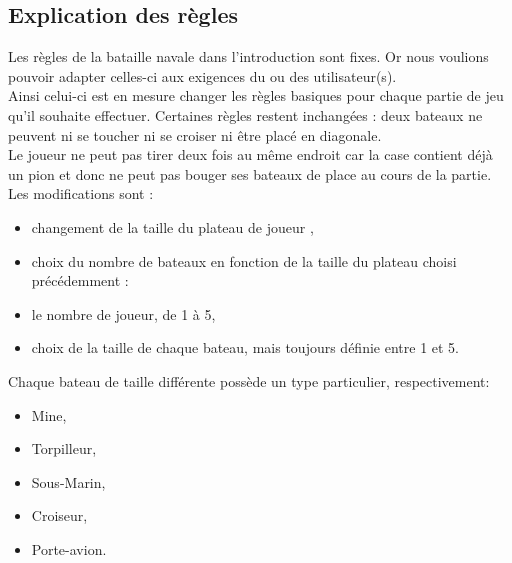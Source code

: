 \documentclass[a4paper,12pt]{article}
\begin{document}
\subsection {Explication des règles}
    Les règles de la bataille navale dans l'introduction sont fixes. Or nous voulions pouvoir adapter celles-ci aux exigences du ou des utilisateur(s). \\ Ainsi celui-ci est en mesure changer les règles basiques pour chaque partie de jeu qu'il souhaite effectuer. Certaines règles restent inchangées : deux bateaux ne peuvent ni se toucher ni se croiser ni être placé en diagonale. \\ Le joueur ne peut pas tirer deux fois au même endroit car la case contient déjà un pion et donc ne peut pas bouger ses bateaux de place au cours de la partie.\vspace{2\baselineskip}\\ Les modifications sont :
            \begin{itemize}
                \item changement de la taille du plateau de joueur ,
                \item choix du nombre de bateaux en fonction de la taille du plateau choisi précédemment :
                \item le nombre de joueur, de 1 à 5,
                \item  choix de la taille de chaque bateau, mais toujours définie entre 1 et 5. 
            \end{itemize} 
            \vspace{2\baselineskip}
        Chaque bateau de taille différente possède un type particulier, respectivement: 
            \begin{itemize}
                 \item Mine,
                 \item Torpilleur,
                 \item Sous-Marin,
                 \item Croiseur,
                 \item Porte-avion. \\
            \end{itemize}
     
\end{document}
